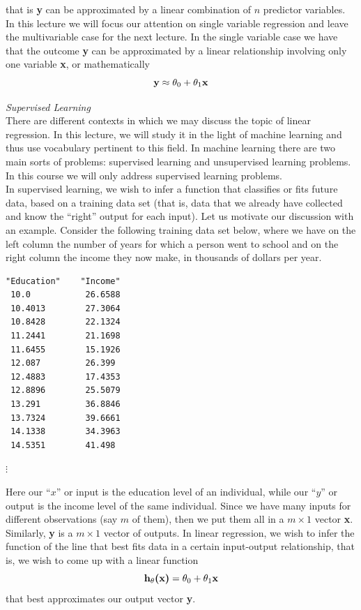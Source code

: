 \documentclass[11pt,a4paper,oneside]{report}
\begin{document}
that is {\bf y} can be approximated by a linear combination of $n$ predictor variables.\\

In this lecture we will focus our attention on single variable regression and leave the multivariable case for the next lecture. In the single variable case we have that the outcome {\bf y} can be approximated by a linear relationship involving only one variable {\bf x}, or mathematically
\[
\textnormal{{\bf y}} \approx  \theta_0 +
\theta_1 \textnormal{{\bf x}}
\]

{\it\Large\color{red} Supervised Learning}\\

There are different contexts in which we may discuss the topic of linear regression. In this lecture, we will study it in the light of machine learning and thus use vocabulary pertinent to this field. In machine learning there are two main sorts of problems: supervised learning and unsupervised learning problems. In this course we will only address supervised learning problems. \\

In supervised learning, we wish to infer a function that classifies or fits future data, based on a training data set (that is, data that we already have collected and know the ``right'' output for each input). Let us motivate our discussion with an example. Consider the following training data set below, where we have on the left column the number of years for which a person went to school and on the right column the income they now make, in thousands of dollars per year.\\

\begin{verbatim}
"Education"    "Income"
 10.0           26.6588   
 10.4013        27.3064   
 10.8428        22.1324   
 11.2441        21.1698   
 11.6455        15.1926   
 12.087         26.399    
 12.4883        17.4353   
 12.8896        25.5079   
 13.291         36.8846   
 13.7324        39.6661   
 14.1338        34.3963   
 14.5351        41.498                    
\end{verbatim}  
$\vdots$

Here our ``$x$'' or input is the education level of an individual, while our ``$y$'' or output is the income level of the same individual. Since we have many inputs for different observations (say $m$ of them), then we put them all in a $m \times 1$ vector {\bf x}. Similarly, {\bf y} is a $m \times 1$ vector of outputs. In linear regression, we wish to infer the function of the line that best fits data in a certain input-output relationship, that is, we wish to come up with a linear function
\[
\textnormal{{\bf h$_{\theta}$(x)}} =  \theta_0 +
\theta_1 \textnormal{{\bf x}}
\]
 that best approximates our output vector {\bf y}.
 
\end{document}
